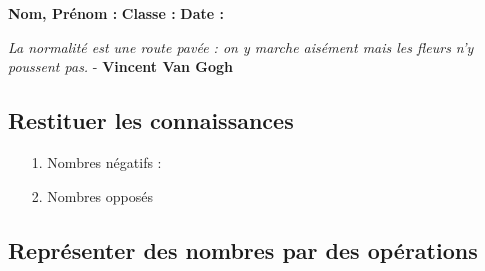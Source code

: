 



\textbf{Nom, Prénom :} \hspace{8cm} \textbf{Classe :} \hspace{3cm} \textbf{Date :}\\

\begin{center}
  \textit{La normalité est une route pavée : on y marche aisément mais les fleurs n’y poussent pas.}  - \textbf{Vincent Van Gogh}
\end{center}

\subsection*{Restituer les connaissances}

\begin{enumerate}
  \item[1.] Nombres négatifs : \dotfill \\
  \item[2.] Nombres opposés \dotfill \\
\end{enumerate}

\subsection*{Représenter des nombres par des opérations}

